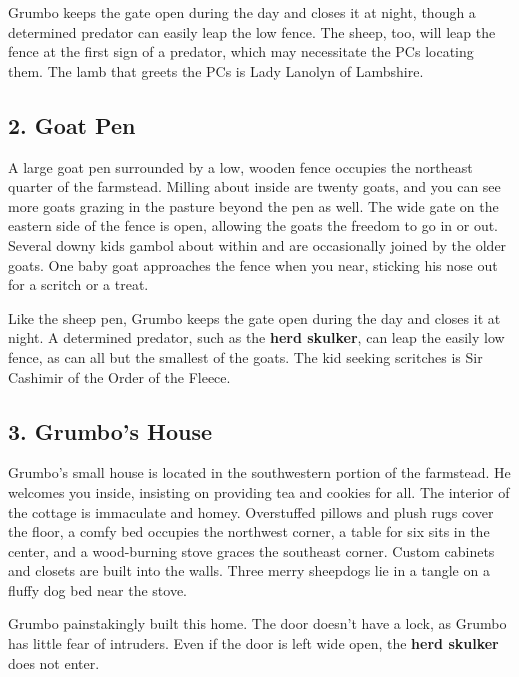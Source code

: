 \documentclass[10pt,a4paper,twoside,bg=print,twocolumn,openany,nodeprecatedcode]{dndbook}
\begin{document}
Grumbo keeps the gate open during the day and closes it at night, though a determined predator can easily leap the low fence. The sheep, too, will leap the fence at the first sign of a predator, which may necessitate the PCs locating them. The lamb that greets the PCs is Lady Lanolyn of Lambshire.

\subsection{2. Goat Pen}
\begin{DndReadAloud}{}
A large goat pen surrounded by a low, wooden fence occupies the northeast quarter of the farmstead. Milling about inside are twenty goats, and you can see more goats grazing in the pasture beyond the pen as well. The wide gate on the eastern side of the fence is open, allowing the goats the freedom to go in or out. Several downy kids gambol about within and are occasionally joined by the older goats. One baby goat approaches the fence when you near, sticking his nose out for a scritch or a treat.

\end{DndReadAloud}

Like the sheep pen, Grumbo keeps the gate open during the day and closes it at night. A determined predator, such as the \textbf{herd skulker}, can leap the easily low fence, as can all but the smallest of the goats. The kid seeking scritches is Sir Cashimir of the Order of the Fleece.

\subsection{3. Grumbo's House}
\begin{DndReadAloud}{}
Grumbo's small house is located in the southwestern portion of the farmstead. He welcomes you inside, insisting on providing tea and cookies for all. The interior of the cottage is immaculate and homey. Overstuffed pillows and plush rugs cover the floor, a comfy bed occupies the northwest corner, a table for six sits in the center, and a wood-burning stove graces the southeast corner. Custom cabinets and closets are built into the walls. Three merry sheepdogs lie in a tangle on a fluffy dog bed near the stove.

\end{DndReadAloud}

Grumbo painstakingly built this home. The door doesn't have a lock, as Grumbo has little fear of intruders. Even if the door is left wide open, the \textbf{herd skulker} does not enter.
\end{document}
